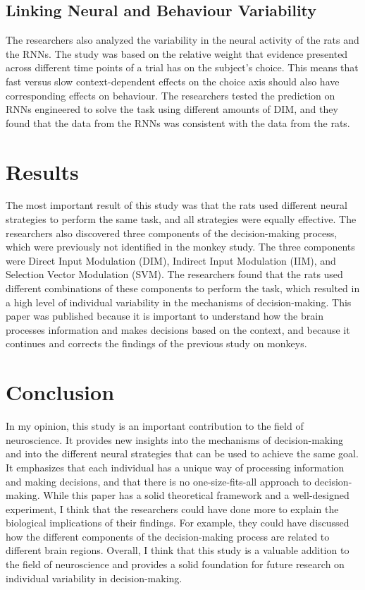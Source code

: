 \documentclass{article}
\begin{document}
\subsection{Linking Neural and Behaviour Variability}
The researchers also analyzed the variability in the neural activity of the rats and the RNNs. The study was based on the relative weight that evidence presented across different time points of a trial has on the subject's choice. This means that fast versus slow context-dependent effects on the choice axis should also have corresponding effects on behaviour. The researchers tested the prediction on RNNs engineered to solve the task using different amounts of DIM, and they found that the data from the RNNs was consistent with the data from the rats.


\section{Results}
The most important result of this study was that the rats used different neural strategies to perform the same task, and all strategies were equally effective. The researchers also discovered three components of the decision-making process, which were previously not identified in the monkey study. The three components were Direct Input Modulation (DIM), Indirect Input Modulation (IIM), and Selection Vector Modulation (SVM). The researchers found that the rats used different combinations of these components to perform the task, which resulted in a high level of individual variability in the mechanisms of decision-making. This paper was published because it is important to understand how the brain processes information and makes decisions based on the context, and because it continues and corrects the findings of the previous study on monkeys.


\section{Conclusion}
In my opinion, this study is an important contribution to the field of neuroscience. It provides new insights into the mechanisms of decision-making and into the different neural strategies that can be used to achieve the same goal. It emphasizes that each individual has a unique way of processing information and making decisions, and that there is no one-size-fits-all approach to decision-making. While this paper has a solid theoretical framework and a well-designed experiment, I think that the researchers could have done more to explain the biological implications of their findings. For example, they could have discussed how the different components of the decision-making process are related to different brain regions. Overall, I think that this study is a valuable addition to the field of neuroscience and provides a solid foundation for future research on individual variability in decision-making.
\end{document}
